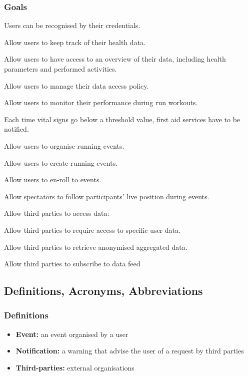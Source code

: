 \documentclass{article}
\begin{document}
\subsubsection{Goals} \label{goals}
\begin{enumerate}[label={\textbf{[G\arabic*]}}]
\item Users can be recognised by their credentials. \label{g1}
\item Allow users to keep track of their health data.
\item Allow users to have access to an overview of their data, including health parameters and performed activities. \label{g3}
\item Allow users to manage their data access policy.
\item Allow users to monitor their performance during run workouts.
\item Each time vital signs go below a threshold value, first aid services have to be notified.
\item Allow users to organise running events.
		\begin{enumerate}[label={[G\arabic{enumi}.\arabic*]}]
    		\item Allow users to create running events.
    		\item Allow users to en-roll to events.
    		\item Allow spectators to follow participants’ live position during events.
  		\end{enumerate}
\item Allow third parties to access data:
		\begin{enumerate}[label={[G\arabic{enumi}.\arabic*]}]
    		\item Allow third parties to require access to specific user data.
    		\item Allow third parties to retrieve anonymised aggregated data.
    		\item Allow third parties to subscribe to data feed 
  		\end{enumerate}

\end{enumerate}

\newpage
\subsection{Definitions, Acronyms, Abbreviations}

\subsubsection{Definitions}
\begin{itemize}
	\item \textbf{Event:} an event organised by a user
	\item \textbf{Notification:} a warning that advise the user of a request by third parties
	\item \textbf{Third-parties:} external organisations
	\end{itemize}
\end{document}
